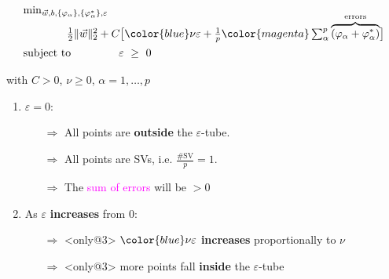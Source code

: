 \begin{frame}%




\begin{minipage}{7.5cm}

\begin{block}{%
}
\slidesonly{\vspace{-5mm}}
	\begingroup
	\footnotesize
     \begin{equation}
        \begin{array}{ll}
        \min_{\vec w, b,\{\varphi_\alpha\}, \{\varphi_\alpha^*\}, \varepsilon} & \\[-1mm]
        & \kern-11ex\frac{1}{2} \lVert \vec w \rVert_{2}^{2} + C \big\lbrack {\color{blue}\nu \varepsilon} + \frac{1}{p} {\color{magenta}\sum_{\alpha}^p \overbrace{(\varphi_\alpha + \varphi_\alpha^*)}^{\text{errors}}} \big\rbrack\\[2mm]
        \text{subject to} &
        \varepsilon~\ge~0\\
        \end{array}
        \label{eq:primalnuepsonly}
     \end{equation}
     
     \slidesonly{\vspace{-2mm}}
        with $C>0$, $\nu \ge 0$, $\alpha=1,\ldots,p$
     \endgroup
\end{block}
\end{minipage}

\begin{enumerate}
\item<only@1> $\varepsilon = 0$:
\begin{itemize}
\item[$\Rightarrow$] All points are \textbf{outside} the $\varepsilon$-tube.{}
\item[$\Rightarrow$] All points are SVs, i.e. $\frac{\#\mathrm{SV}}{p}=1$.
\item[$\Rightarrow$] The \textcolor{magenta}{sum of errors} will be $> 0$
\end{itemize}
\pause
\item<only@2-6>As $\varepsilon$ \textbf{increases} from $0$:
\begin{itemize}
\item[$\Rightarrow$]<only@3> ${\color{blue}\nu\varepsilon}$ \textbf{increases} proportionally to $\nu$
\item[$\Rightarrow$]<only@3> more points fall \textbf{inside} the $\varepsilon$-tube


\end{itemize}
\end{enumerate}
\end{frame}
